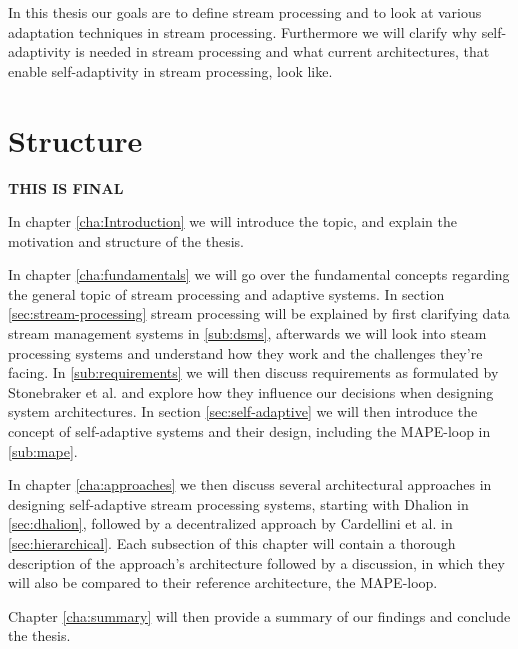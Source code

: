 In this thesis our goals are to define stream processing and to look at various adaptation techniques in stream processing. Furthermore we will clarify why
self-adaptivity is needed in stream processing and what current architectures, that enable self-adaptivity in stream processing, look like.


\section{Structure}
\label{sec:structure}
\textbf{\color{green}THIS IS FINAL}

In chapter \ref{cha:Introduction} we will introduce the topic, and explain the motivation and structure of the thesis.

In chapter \ref{cha:fundamentals} we will go over the fundamental concepts regarding the general topic of stream processing and adaptive systems.
In section \ref{sec:stream-processing} stream processing will be explained by first clarifying data stream management systems 
in \ref{sub:dsms}, afterwards we will look into steam processing systems and understand how they work and the challenges they're facing.
In \ref{sub:requirements} we will then discuss requirements as formulated by Stonebraker et al. and explore how they influence our decisions when designing system architectures.
In section \ref{sec:self-adaptive} we will then introduce the concept of self-adaptive systems and their design, including the MAPE-loop in \ref{sub:mape}.

In chapter \ref{cha:approaches} we then discuss several architectural approaches in designing self-adaptive stream processing systems, starting with Dhalion in \ref{sec:dhalion}, 
followed by a decentralized approach by Cardellini et al. in \ref{sec:hierarchical}.
Each subsection of this chapter will contain a thorough description of the approach's architecture followed by a discussion, 
in which they will also be compared to their reference architecture, the MAPE-loop.

Chapter \ref{cha:summary} will then provide a summary of our findings and conclude the thesis.